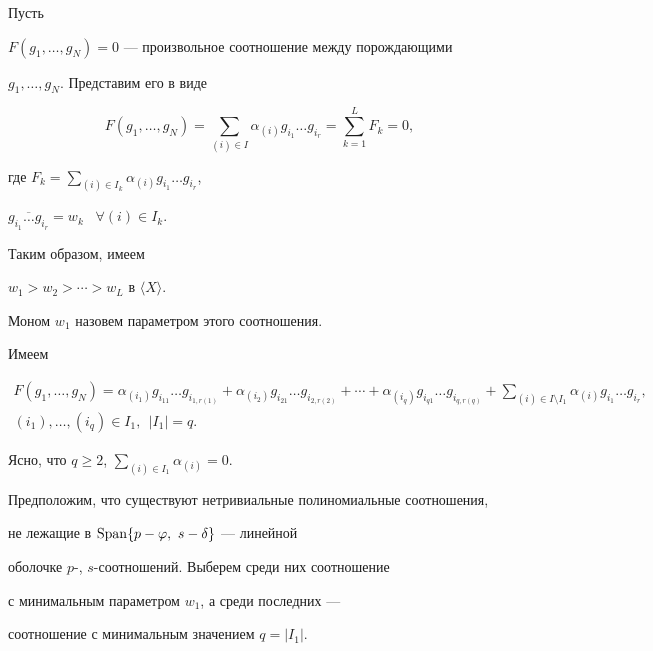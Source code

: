 \begin{pf} Пусть


$F(g_{1},\dotsc,g_{N})=0$ --- произвольное соотношение между порождающими


$g_{1},\dotsc,g_{N}$. Представим его в виде


$$


F(g_{1},\dotsc,g_{N})=\sum_{(i)\in I}\alpha_{(i)}g_{i_{1}}\dotsc g_{i_{r}}=


\sum_{k=1}^{L}F_{k}=0,


$$


где $F_{k}=\sum\limits_{(i)\in I_{k}}\alpha_{(i)}g_{i_{1}}\dotsc g_{i_{r}}$,


$\overline{g_{i_{1}}\dotsc g_{i_{r}}}=w_{k}$ \ $\forall (i)\in I_{k}$.


Таким образом, имеем


$w_{1}>w_{2}>\dotsb >w_{L}$ в $\langle X\rangle$.


Моном $w_{1}$ назовем параметром этого соотношения.





Имеем


\begin{gather*}


F(g_{1},\dotsc,g_{N})=\alpha_{(i_{1})}g_{i_{11}}\dotsc g_{i_{1,r(1)}}+


\alpha_{(i_{2})}g_{i_{21}}\dotsc g_{i_{2,r(2)}}+\dotsb+


\alpha_{(i_{q})}g_{i_{q1}}\dotsc g_{i_{q,r(q)}}+


\sum_{(i)\in I\setminus I_{1}}\alpha_{(i)}g_{i_{1}}\dotsc g_{i_{r}},\\


%


(i_{1}),\dotsc,(i_{q})\in I_{1},\ \ |I_{1}|=q.


\end{gather*}


Ясно, что $q\geq 2$, $\sum\limits_{(i)\in I_{1}}\alpha_{(i)}=0$.





Предположим, что существуют нетривиальные полиномиальные соотношения,


не лежащие в $\Span\lbrace p-\varphi,\ s-\delta\rbrace$ --- линейной


оболочке $p$-, $s$-соотношений. Выберем среди них соотношение


с минимальным параметром $w_{1}$, а среди последних ---


соотношение с минимальным значением $q=|I_{1}|$.



\end{pf}
